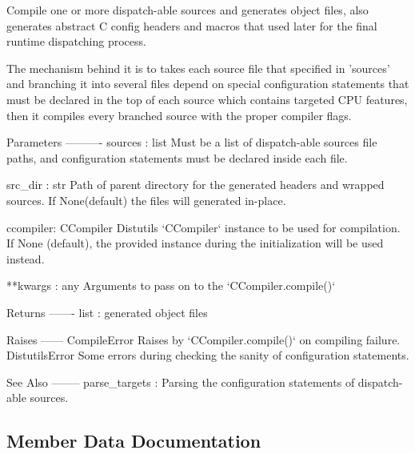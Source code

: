 \begin{DoxyVerb}Compile one or more dispatch-able sources and generates object files,
also generates abstract C config headers and macros that
used later for the final runtime dispatching process.

The mechanism behind it is to takes each source file that specified
in 'sources' and branching it into several files depend on
special configuration statements that must be declared in the
top of each source which contains targeted CPU features,
then it compiles every branched source with the proper compiler flags.

Parameters
----------
sources : list
    Must be a list of dispatch-able sources file paths,
    and configuration statements must be declared inside
    each file.

src_dir : str
    Path of parent directory for the generated headers and wrapped sources.
    If None(default) the files will generated in-place.

ccompiler: CCompiler
    Distutils `CCompiler` instance to be used for compilation.
    If None (default), the provided instance during the initialization
    will be used instead.

**kwargs : any
    Arguments to pass on to the `CCompiler.compile()`

Returns
-------
list : generated object files

Raises
------
CompileError
    Raises by `CCompiler.compile()` on compiling failure.
DistutilsError
    Some errors during checking the sanity of configuration statements.

See Also
--------
parse_targets :
    Parsing the configuration statements of dispatch-able sources.
\end{DoxyVerb}
 

\subsection{Member Data Documentation}
\mbox{\label{classnumpy_1_1distutils_1_1ccompiler__opt_1_1CCompilerOpt_ad692c5743b8c9d9eb06cb0d5d6f6aae6}} 
